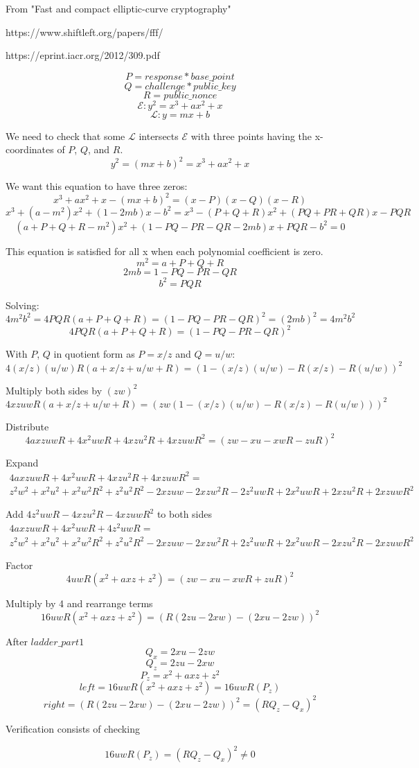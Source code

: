 \documentclass[fleqn]{amsart}
\begin{document}
\setlength{\parindent}{0pt}
\setlength{\mathindent}{0pt}

From "Fast and compact elliptic-curve cryptography"

https://www.shiftleft.org/papers/fff/

https://eprint.iacr.org/2012/309.pdf

$$P = response*base\_point$$
$$Q = challenge*public\_key$$
$$R = public\_nonce$$
$$\mathcal{E}: y^2 = x^3 + ax^2 + x$$
$$\mathcal{L}: y = mx + b$$

We need to check that some $\mathcal{L}$ intersects $\mathcal{E}$ with three points having the x-coordinates of $P$, $Q$, and $R$.
$$y^2 = (mx + b)^2 = x^3 + ax^2 + x$$

We want this equation to have three zeros:
$$x^3 + ax^2 + x - (mx + b)^2 = (x - P)(x - Q)(x - R)$$
$$x^3 + (a - m^2)x^2 + (1 - 2mb)x - b^2 =
x^3 - (P + Q + R)x^2 + (PQ + PR + QR)x - PQR$$
$$(a + P + Q + R - m^2)x^2 + (1 - PQ - PR - QR - 2mb)x + PQR - b^2 = 0$$

This equation is satisfied for all x when each polynomial
coefficient is zero.
$$m^2 = a + P + Q + R$$
$$2mb = 1 - PQ - PR - QR$$
$$b^2 = PQR$$

Solving:
$$4m^2b^2 = 4PQR(a + P + Q + R) = (1 - PQ - PR - QR)^2 = (2mb)^2 = 4m^2b^2$$
$$4PQR(a + P + Q + R) = (1 - PQ - PR - QR)^2$$

With $P$, $Q$ in quotient form as $P = x/z$ and $Q = u/w$:
$$4(x/z)(u/w)R(a + x/z + u/w + R) = (1 - (x/z)(u/w) - R(x/z) - R(u/w))^2$$

Multiply both sides by $(zw)^2$
$$4xzuwR(a + x/z + u/w + R) = (zw(1 - (x/z)(u/w) - R(x/z) - R(u/w)))^2$$

Distribute
$$4axzuwR + 4x^2uwR + 4xzu^2R + 4xzuwR^2 = (zw - xu - xwR - zuR)^2$$

Expand
\begin{multline*}
4axzuwR + 4x^2uwR + 4xzu^2R + 4xzuwR^2 = \\
z^2w^2 + x^2u^2 + x^2w^2R^2 + z^2u^2R^2 - 2xzuw - 2xzw^2R - 2z^2uwR + 2x^2uwR + 2xzu^2R + 2xzuwR^2
\end{multline*}

Add $4z^2uwR - 4xzu^2R - 4xzuwR^2$ to both sides
\begin{multline*}
4axzuwR + 4x^2uwR + 4z^2uwR = \\
z^2w^2 + x^2u^2 + x^2w^2R^2 + z^2u^2R^2 - 2xzuw - 2xzw^2R + 2z^2uwR + 2x^2uwR - 2xzu^2R - 2xzuwR^2
\end{multline*}

Factor
$$4uwR(x^2 + axz + z^2) = (zw - xu - xwR + zuR)^2$$

Multiply by 4 and rearrange terms
$$16uwR(x^2 + axz + z^2) = (R(2zu - 2xw) - (2xu - 2zw))^2$$

After $ladder\_part1$
$$Q_x = 2xu - 2zw$$
$$Q_z = 2zu - 2xw$$
$$P_z = x^2 + axz + z^2$$
$$left = 16uwR(x^2 + axz + z^2) = 16uwR(P_z)$$
$$right = (R(2zu - 2xw) - (2xu - 2zw))^2 = (RQ_z - Q_x)^2$$

Verification consists of checking

$$16uwR(P_z) = (RQ_z - Q_x)^2 \neq 0$$
\end{document}

